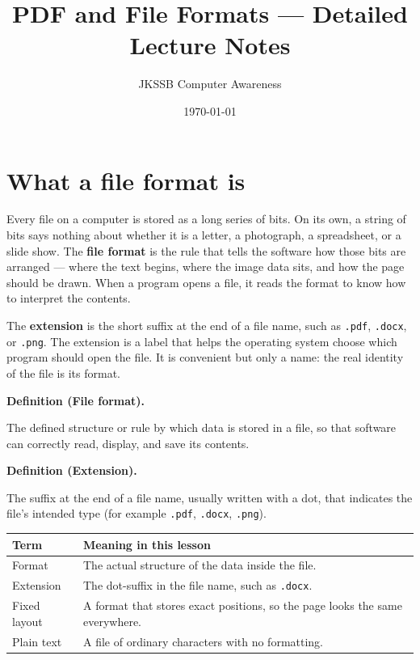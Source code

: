 \documentclass[11pt]{article}
\title{PDF and File Formats --- Detailed Lecture Notes}
\author{JKSSB Computer Awareness}
\date{\today}
\newenvironment{definitionbox}[1]{%
  \par\noindent\textbf{Definition (#1).}\ \itshape
}{\par\vspace{0.3em}}
\begin{document}
\maketitle

\section{What a file format is}
Every file on a computer is stored as a long series of bits. On its own, a
string of bits says nothing about whether it is a letter, a photograph, a
spreadsheet, or a slide show. The \textbf{file format} is the rule that tells
the software how those bits are arranged --- where the text begins, where the
image data sits, and how the page should be drawn. When a program opens a
file, it reads the format to know how to interpret the contents.

The \textbf{extension} is the short suffix at the end of a file name, such as
\texttt{.pdf}, \texttt{.docx}, or \texttt{.png}. The extension is a label
that helps the operating system choose which program should open the file.
It is convenient but only a name: the real identity of the file is its format.

\begin{definitionbox}{File format}
The defined structure or rule by which data is stored in a file, so that
software can correctly read, display, and save its contents.
\end{definitionbox}

\begin{definitionbox}{Extension}
The suffix at the end of a file name, usually written with a dot, that
indicates the file's intended type (for example \texttt{.pdf}, \texttt{.docx},
\texttt{.png}).
\end{definitionbox}

\begin{center}
\begin{tabular}{p{}p{}}
\toprule
\textbf{Term} & \textbf{Meaning in this lesson} \\
\midrule
Format & The actual structure of the data inside the file. \\
Extension & The dot-suffix in the file name, such as \texttt{.docx}. \\
Fixed layout & A format that stores exact positions, so the page looks the same everywhere. \\
Plain text & A file of ordinary characters with no formatting. \\
\bottomrule
\end{tabular}
\end{center}
\end{document}
